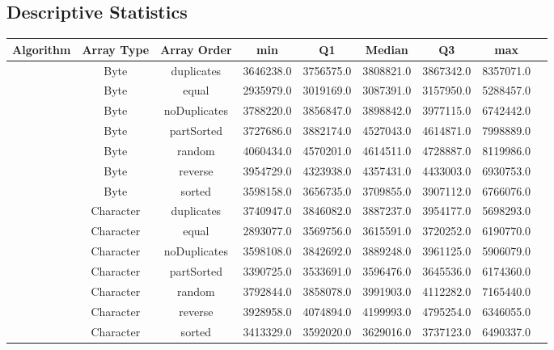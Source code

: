 \documentclass{article}
\begin{document}
\subsection{Descriptive Statistics}
\begin{table}[H]
    \centering
    \label{tab:algorithm_metrics}
    \begin{tabular}{|c|c|c|c|c|c|c|c|c|}
        \toprule
        \textbf{Algorithm} & \textbf{Array Type} & \textbf{Array Order} & \textbf{min} & \textbf{Q1} & \textbf{Median} & \textbf{Q3} & \textbf{max} \\
        \midrule
        & Byte & duplicates & 3646238.0 & 3756575.0 & 3808821.0 & 3867342.0 & 8357071.0 \\
        & Byte & equal & 2935979.0 & 3019169.0 & 3087391.0 & 3157950.0 & 5288457.0 \\
        & Byte & noDuplicates & 3788220.0 & 3856847.0 & 3898842.0 & 3977115.0 & 6742442.0 \\
        & Byte & partSorted & 3727686.0 & 3882174.0 & 4527043.0 & 4614871.0 & 7998889.0 \\
        & Byte & random & 4060434.0 & 4570201.0 & 4614511.0 & 4728887.0 & 8119986.0 \\
        & Byte & reverse & 3954729.0 & 4323938.0 & 4357431.0 & 4433003.0 & 6930753.0 \\
        & Byte & sorted & 3598158.0 & 3656735.0 & 3709855.0 & 3907112.0 & 6766076.0 \\
       
        & Character & duplicates & 3740947.0 & 3846082.0 & 3887237.0 & 3954177.0 & 5698293.0 \\
        & Character & equal & 2893077.0 & 3569756.0 & 3615591.0 & 3720252.0 & 6190770.0 \\
        & Character & noDuplicates & 3598108.0 & 3842692.0 & 3889248.0 & 3961125.0 & 5906079.0 \\
        & Character & partSorted & 3390725.0 & 3533691.0 & 3596476.0 & 3645536.0 & 6174360.0 \\
        & Character & random & 3792844.0 & 3858078.0 & 3991903.0 & 4112282.0 & 7165440.0 \\
        & Character & reverse & 3928958.0 & 4074894.0 & 4199993.0 & 4795254.0 & 6346055.0 \\
        & Character & sorted & 3413329.0 & 3592020.0 & 3629016.0 & 3737123.0 & 6490337.0 \\
        

\end{tabular}
\end{table}
\end{document}
